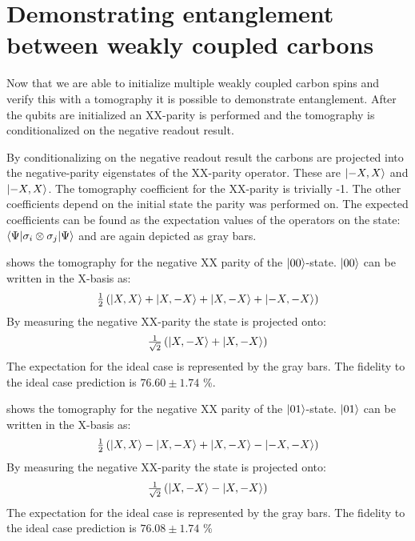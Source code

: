 \section{Demonstrating entanglement between weakly coupled carbons}
Now that we are able to initialize multiple weakly coupled carbon spins and verify this with a tomography it is possible to demonstrate entanglement.
After the qubits are initialized an XX-parity is performed and the tomography is conditionalized on the negative readout result.

By conditionalizing on the negative readout result the carbons are projected into the negative-parity eigenstates of the XX-parity operator.
These are ${\left\vert{-X,X}\right\rangle}$ and ${\left\vert{-X,X}\right\rangle}$.
The tomography coefficient for the XX-parity is trivially -1.
The other coefficients depend on the initial state the parity was performed on.
The expected coefficients can be found as the expectation values of the operators on the state: ${\left\langle{\Psi}\right\vert} \sigma_i \otimes \sigma_j {\left\vert{\Psi}\right\rangle}$ and are again depicted as gray bars.

 shows the tomography for the negative XX parity of the ${\left\vert{00}\right\rangle}$-state.
${\left\vert{00}\right\rangle}$ can be written in the X-basis as:
\begin{equation}
      \tfrac{1}{2} \left( {\left\vert{X,X}\right\rangle} + {\left\vert{X,-X}\right\rangle} +{\left\vert{X,-X}\right\rangle} + {\left\vert{-X,-X}\right\rangle} \right)
 \end{equation}
By measuring the negative XX-parity the state is projected onto:
\begin{equation}
    \tfrac{1}{\sqrt{2}} \left( {\left\vert{X,-X}\right\rangle} +{\left\vert{X,-X}\right\rangle} \right)
\end{equation}
The expectation for the ideal case is represented by the gray bars.
The fidelity to the ideal case prediction is $76.60 \pm 1.74$ \%.


 shows the tomography for the negative XX parity of the ${\left\vert{01}\right\rangle}$-state.
${\left\vert{01}\right\rangle}$ can be written in the X-basis as:
\begin{equation}
    \tfrac{1}{2} \left( {\left\vert{X,X}\right\rangle} - {\left\vert{X,-X}\right\rangle} +{\left\vert{X,-X}\right\rangle} - {\left\vert{-X,-X}\right\rangle} \right)
 \end{equation}
By measuring the negative XX-parity the state is projected onto:
\begin{equation}
    \tfrac{1}{\sqrt{2}} \left( {\left\vert{X,-X}\right\rangle} -{\left\vert{X,-X}\right\rangle} \right)
\end{equation}
The expectation for the ideal case is represented by the gray bars.
The fidelity to the ideal case prediction is  $76.08 \pm 1.74$ \%



